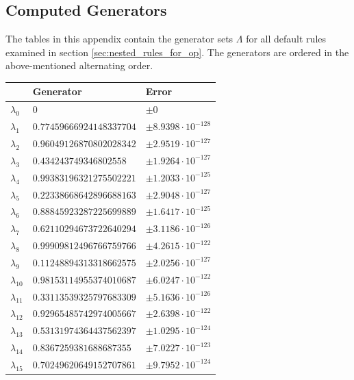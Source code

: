 \documentclass[a4paper,10pt]{article}
\begin{document}
\begin{appendix}
\FloatBarrier
\section{Computed Generators}

The tables in this appendix contain the generator sets $\Lambda$ for all default
rules examined in section \ref{sec:nested_rules_for_op}. The generators are
ordered in the above-mentioned alternating order.

\begin{table}[h]
  \centering
  \begin{tabular}{|l|ll|}
  \hline
  {}             & Generator                 & Error \\
  \hline
  $\lambda_{0}$  & $0$                       &  $\pm 0$ \\
  $\lambda_{1}$  & $0.77459666924148337704$  &  $\pm 8.9398 \cdot 10^{-128}$ \\
  $\lambda_{2}$  & $0.96049126870802028342$  &  $\pm 2.9519 \cdot 10^{-127}$ \\
  $\lambda_{3}$  & $0.434243749346802558$    &  $\pm 1.9264 \cdot 10^{-127}$ \\
  $\lambda_{4}$  & $0.99383196321275502221$  &  $\pm 1.2033 \cdot 10^{-125}$ \\
  $\lambda_{5}$  & $0.22338668642896688163$  &  $\pm 2.9048 \cdot 10^{-127}$ \\
  $\lambda_{6}$  & $0.88845923287225699889$  &  $\pm 1.6417 \cdot 10^{-125}$ \\
  $\lambda_{7}$  & $0.62110294673722640294$  &  $\pm 3.1186 \cdot 10^{-126}$ \\
  $\lambda_{8}$  & $0.99909812496766759766$  &  $\pm 4.2615 \cdot 10^{-122}$ \\
  $\lambda_{9}$  & $0.11248894313318662575$  &  $\pm 2.0256 \cdot 10^{-127}$ \\
  $\lambda_{10}$ & $0.98153114955374010687$  &  $\pm 6.0247 \cdot 10^{-122}$ \\
  $\lambda_{11}$ & $0.33113539325797683309$  &  $\pm 5.1636 \cdot 10^{-126}$ \\
  $\lambda_{12}$ & $0.92965485742974005667$  &  $\pm 2.6398 \cdot 10^{-122}$ \\
  $\lambda_{13}$ & $0.53131974364437562397$  &  $\pm 1.0295 \cdot 10^{-124}$ \\
  $\lambda_{14}$ & $0.8367259381688687355$   &  $\pm 7.0227 \cdot 10^{-123}$ \\
  $\lambda_{15}$ & $0.70249620649152707861$  &  $\pm 9.7952 \cdot 10^{-124}$ \\

\end{tabular}
\end{table}
\end{appendix}
\end{document}
